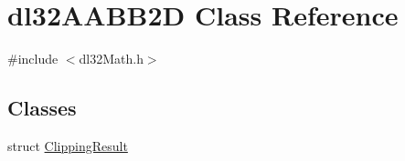 \hypertarget{classdl32_a_a_b_b2_d}{\section{dl32\-A\-A\-B\-B2\-D Class Reference}
\label{classdl32_a_a_b_b2_d}
}


{\ttfamily \#include $<$dl32\-Math.\-h$>$}

\subsection*{Classes}
\begin{DoxyCompactItemize}
\item 
struct \hyperlink{structdl32_a_a_b_b2_d_1_1_clipping_result}{Clipping\-Result}
\end{DoxyCompactItemize}
